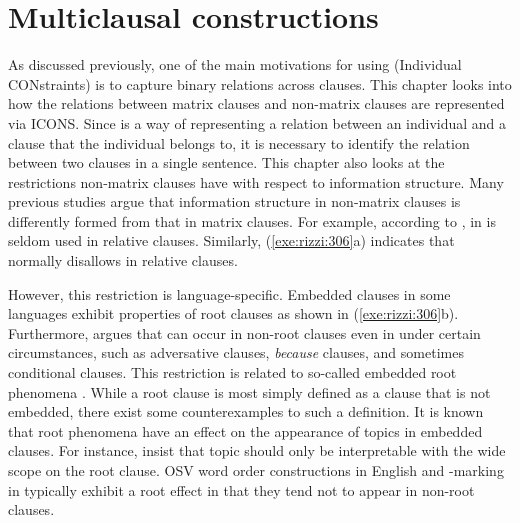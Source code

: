 \chapter{Multiclausal constructions}
\label{chapter10-2}
\setcounter{enums}{0}

\noindent As discussed previously, one of the main motivations for
using  (Individual CONstraints)
is to capture binary relations across clauses.
This chapter looks into how the relations between matrix clauses and
non-matrix clauses are represented via ICONS. Since  is a
way of representing a relation between an individual and a clause that
the individual belongs to, it is necessary to identify the relation
between two clauses in a single sentence.  This chapter also looks at
the restrictions non-matrix clauses have with respect to information
structure.  Many previous studies argue that information structure in
non-matrix clauses is differently formed from that in matrix clauses.
For example, according to \citet{kuno:73}, \wa in  is
seldom used in relative clauses. Similarly,
(\ref{exe:rizzi:306}a) indicates that  normally disallows
 in relative clauses.


\noindent However, this restriction is language-specific.  Embedded
clauses in some languages exhibit properties of root clauses as shown
in (\ref{exe:rizzi:306}b).  Furthermore, \citet{haegeman:04} argues
that   can occur in non-root clauses even in
 under certain circumstances, such as adversative clauses,
\textit{because} clauses, and sometimes conditional clauses.  This
restriction is related to so-called embedded root phenomena
\citep{heycock:07}.
While a root clause is most simply defined as a
clause that is not embedded, there exist some counterexamples to such
a definition. It is known that root phenomena have an effect on the
appearance of topics in embedded clauses. For instance,
\citet{portner:yabushita:98} insist that topic should only be
interpretable with the wide scope on the root clause.  OSV word order
constructions in English and \wa-marking in  typically
exhibit a root effect in that they tend not to appear in non-root
clauses.



